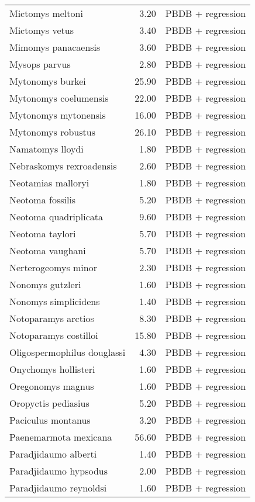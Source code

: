 \begin{table}[ht]
\begin{tabular}{lrl}
  Mictomys meltoni & 3.20 & PBDB + regression \\ 
  Mictomys vetus & 3.40 & PBDB + regression \\ 
  Mimomys panacaensis & 3.60 & PBDB + regression \\ 
  Mysops parvus & 2.80 & PBDB + regression \\ 
  Mytonomys burkei & 25.90 & PBDB + regression \\ 
  Mytonomys coelumensis & 22.00 & PBDB + regression \\ 
  Mytonomys mytonensis & 16.00 & PBDB + regression \\ 
  Mytonomys robustus & 26.10 & PBDB + regression \\ 
  Namatomys lloydi & 1.80 & PBDB + regression \\ 
  Nebraskomys rexroadensis & 2.60 & PBDB + regression \\ 
  Neotamias malloryi & 1.80 & PBDB + regression \\ 
  Neotoma fossilis & 5.20 & PBDB + regression \\ 
  Neotoma quadriplicata & 9.60 & PBDB + regression \\ 
  Neotoma taylori & 5.70 & PBDB + regression \\ 
  Neotoma vaughani & 5.70 & PBDB + regression \\ 
  Nerterogeomys minor & 2.30 & PBDB + regression \\ 
  Nonomys gutzleri & 1.60 & PBDB + regression \\ 
  Nonomys simplicidens & 1.40 & PBDB + regression \\ 
  Notoparamys arctios & 8.30 & PBDB + regression \\ 
  Notoparamys costilloi & 15.80 & PBDB + regression \\ 
  Oligospermophilus douglassi & 4.30 & PBDB + regression \\ 
  Onychomys hollisteri & 1.60 & PBDB + regression \\ 
  Oregonomys magnus & 1.60 & PBDB + regression \\ 
  Oropyctis pediasius & 5.20 & PBDB + regression \\ 
  Paciculus montanus & 3.20 & PBDB + regression \\ 
  Paenemarmota mexicana & 56.60 & PBDB + regression \\ 
  Paradjidaumo alberti & 1.40 & PBDB + regression \\ 
  Paradjidaumo hypsodus & 2.00 & PBDB + regression \\ 
  Paradjidaumo reynoldsi & 1.60 & PBDB + regression \\ 

\end{tabular}
\end{table}
